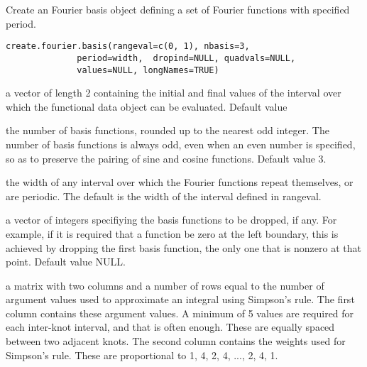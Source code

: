 \documentclass{article}
\begin{document}
\begin{Description}\relax
Create an Fourier basis object defining a set of Fourier
functions with specified period.
\end{Description}
\begin{Usage}
\begin{verbatim}
create.fourier.basis(rangeval=c(0, 1), nbasis=3,
              period=width,  dropind=NULL, quadvals=NULL,
              values=NULL, longNames=TRUE)
\end{verbatim}
\end{Usage}
\begin{Arguments}
\begin{ldescription}
\item[\code{rangeval}] a vector of length 2 containing the initial and final
values of the interval over which the functional
data object can be evaluated.  Default value 

\item[\code{nbasis}] the number of basis functions, rounded up to the nearest odd
integer.  The number of basis functions is always odd, even when an
even number is specified, so as to preserve the pairing of sine and
cosine functions.  Default value 3. 

\item[\code{period}] the width of any interval over which the Fourier functions repeat
themselves, or are periodic.  The default is the width of the
interval defined in rangeval.

\item[\code{dropind}] a vector of integers specifiying the basis functions to
be dropped, if any.  For example, if it is required that
a function be zero at the left boundary, this is achieved
by dropping the first basis function, the only one that
is nonzero at that point. Default value NULL.

\item[\code{quadvals}] a matrix with two columns and a number of rows equal to the number
of argument values used to approximate an integral using Simpson's
rule.  The first column contains these argument values.  A minimum
of 5 values are required for each inter-knot interval, and that is
often enough. These are equally spaced between two adjacent knots.
The second column contains the weights used for Simpson's rule.
These are proportional to 1, 4, 2, 4, ..., 2, 4, 1.  


\end{ldescription}
\end{Arguments}
\end{document}

